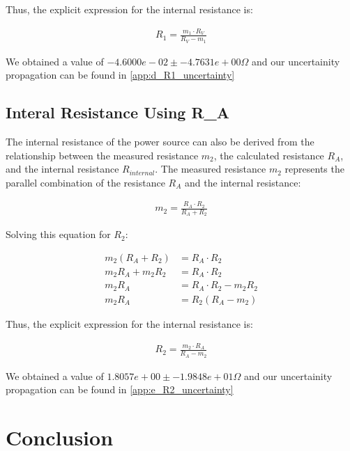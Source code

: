 \documentclass{article} %
\begin{document}
Thus, the explicit expression for the internal resistance is:

\begin{align*}
R_{1} = \frac{m_1 \cdot R_V}{R_V - m_1}
\end{align*}

We obtained a value of $-4.6000e-02 \pm -4.7631e+00 \Omega$ and our uncertainity propagation can be found in \ref{app:d_R1_uncertainty}

\subsection{Interal Resistance Using R\_A}

The internal resistance of the power source can also be derived from the relationship between the measured resistance $m_2$, the calculated resistance $R_A$, and the internal resistance $R_{internal}$. 
The measured resistance $m_2$ represents the parallel combination of the resistance $R_A$ and the internal resistance:

\begin{align*}
m_2 = \frac{R_A \cdot R_{2}}{R_A + R_{2}}
\end{align*}

Solving this equation for $R_{2}$:

\begin{align*}
m_2 (R_A + R_{2}) &= R_A \cdot R_{2} \\
m_2 R_A + m_2 R_{2} &= R_A \cdot R_{2} \\
m_2 R_A &= R_A \cdot R_{2} - m_2 R_{2} \\
m_2 R_A &= R_{2} (R_A - m_2)
\end{align*}

Thus, the explicit expression for the internal resistance is:

\begin{align*}
R_{2} = \frac{m_2 \cdot R_A}{R_A - m_2}
\end{align*}

We obtained a value of $1.8057e+00 \pm -1.9848e+01 \Omega$ and our uncertainity propagation can be found in \ref{app:e_R2_uncertainty}

\section{Conclusion}

\label{last_page}

\newpage
% 
% 
\end{document}
